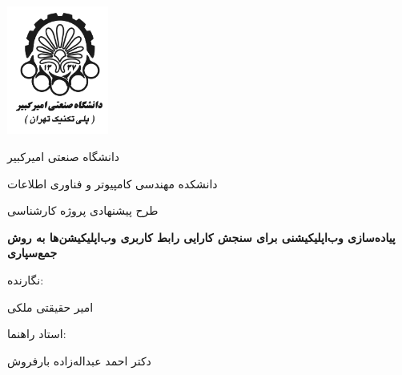 		\centering
		\includegraphics[width=0.25\textwidth]{Resources/logo.png}\par\vspace{1cm}
		{\scshape\LARGE دانشگاه صنعتی امیرکبیر \par}
		{\scshape\LARGE دانشکده مهندسی کامپیوتر و فناوری اطلاعات \par}
		\vspace{1cm}
		{\scshape\Large
			طرح پیشنهادی پروژه کارشناسی
			\par}
		\vspace{1.5cm}
		{\huge\bfseries 
			پیاده‌سازی وب‌اپلیکیشنی برای سنجش کارایی رابط کاربری وب‌اپلیکیشن‌ها به روش جمع‌سپاری
			\par}
		\vspace{2cm}
		نگارنده:\par
		{\Large امیر حقیقتی ملکی\par}
		\vfill
		استاد راهنما:\par
		{\Large دکتر احمد عبداله‌زاده بارفروش\par}
		\vfill
		
		{\large {}\par}